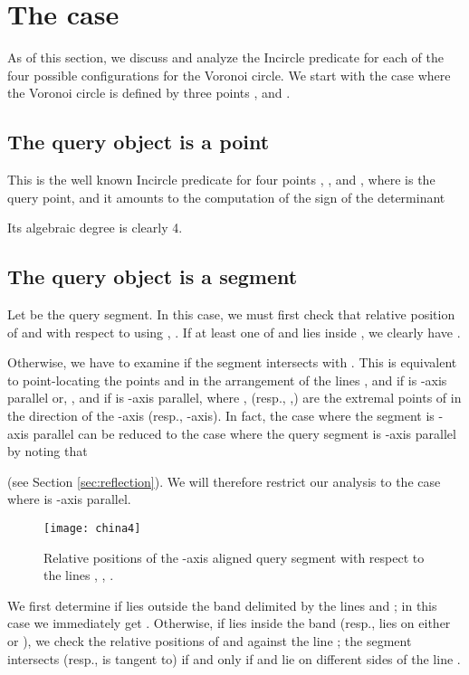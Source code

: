 \documentclass[letterpaper,11pt]{article}
\newcommand{\incircle}{\textsf{Incircle}\xspace}
\newcommand{\vor}{Voronoi\xspace}
\newcommand{\ppp}{\xspace}
\begin{document}
{\section{The \ppp case}\label{sec:ppp}

As of this section, we discuss and analyze the \incircle predicate for
each of the four possible configurations for the \vor circle. We start
with the case where the \vor circle is defined by three points ,
 and .

\subsection{The query object is a point}\label{sec:pppp}
This is the well known \incircle predicate for four points , ,
 and , where  is the query point, and it amounts to the
computation of the sign of the determinant

Its algebraic degree is clearly 4. 




\subsection{The query object is a segment}\label{sec:ppps}

Let  be the query segment.
In this case, we must first check that relative position of  and
 with respect to  using , . If at least one of  and  lies inside , we
clearly have . 

Otherwise, we have to examine if the segment  intersects with
. This is equivalent to point-locating the points  and
 in the arrangement of the lines ,  and
 if  is -axis parallel or, ,  and  if 
 is -axis parallel, where ,  (resp.,
 ,) are the extremal points of  in the
direction of the -axis (resp., -axis). In fact, the case where
the segment  is -axis parallel can be reduced to the case where
the query segment is -axis parallel by noting that 

(see Section \ref{sec:reflection}). We will
therefore restrict our analysis to the case where  is -axis
parallel. 

\begin{figure}[b]
  \begin{center}
    \texttt{[image: china4]} 
  \end{center}
  \caption{Relative positions of the -axis aligned query segment
     with respect to the lines , , .}
  \label{fig:ppps}
\end{figure}

We first determine if  lies outside the band delimited by the lines
 and ; in this case we immediately get
. Otherwise, if  lies inside the band
(resp.,  lies on either  or ), we check the
relative positions of  and  against the line ; the
segment  intersects (resp., is tangent to)  if and only
if  and  lie on different sides of the line . 

}
\end{document}
